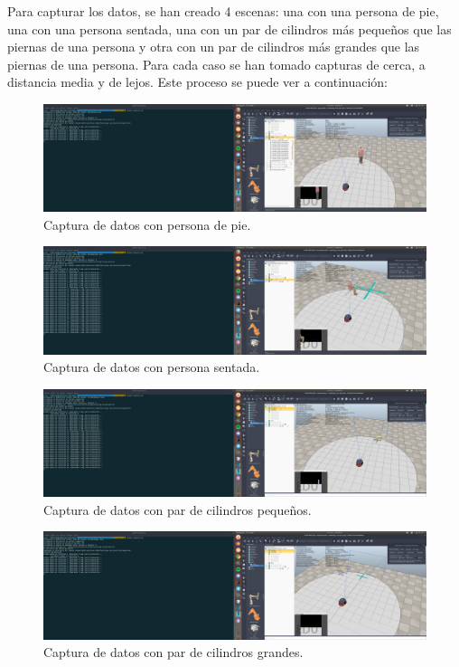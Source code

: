 \documentclass[11pt,a4paper]{article}
\begin{document}
Para capturar los datos, se han creado 4 escenas: una con una persona de pie, una con una persona
sentada, una con un par de cilindros más pequeños que las piernas de una persona y otra
con un par de cilindros más grandes que las piernas de una persona. Para cada caso se han tomado
capturas de cerca, a distancia media y de lejos. Este proceso se puede ver a continuación:

\begin{figure}[H]
\centering
\includegraphics[scale=0.1]{img/pie2.png}
\caption{Captura de datos con persona de pie.}
\end{figure}

\begin{figure}[H]
\centering
\includegraphics[scale=0.1]{img/sentado2.png}
\caption{Captura de datos con persona sentada.}
\end{figure}

\begin{figure}[H]
\centering
\includegraphics[scale=0.1]{img/peque2.png}
\caption{Captura de datos con par de cilindros pequeños.}
\end{figure}

\begin{figure}[H]
\centering
\includegraphics[scale=0.1]{img/grande2.png}
\caption{Captura de datos con par de cilindros grandes.}
\end{figure}
\end{document}

